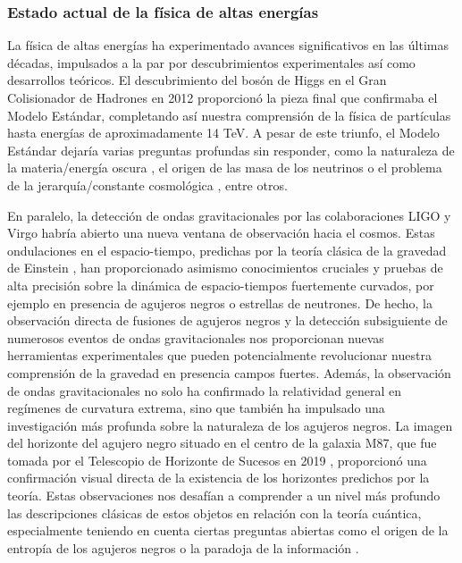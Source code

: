 \subsubsection*{Estado actual de la física de altas energías}

La física de altas energías ha experimentado avances significativos en las últimas décadas, impulsados a la par por descubrimientos experimentales así como desarrollos teóricos. El descubrimiento del bosón de Higgs \cite{ATLAS:2012yve, CMS:2012qbp} en el Gran Colisionador de Hadrones en 2012 proporcionó la pieza final que confirmaba el Modelo Estándar, completando así nuestra comprensión de la física de partículas hasta energías de aproximadamente 14 TeV. A pesar de este triunfo, el Modelo Estándar dejaría varias preguntas profundas sin responder, como la naturaleza de la materia/energía oscura \cite{Planck:2015fie}, el origen de las masa de los neutrinos \cite{Super-Kamiokande:1998uiq, SNO:2002tuh, KamLAND:2002uet} o el problema de la jerarquía/constante cosmológica \cite{Weinberg:1988cp}, entre otros.

En paralelo, la detección de ondas gravitacionales por las colaboraciones LIGO y Virgo \cite{LIGO} habría abierto una nueva ventana de observación hacia el cosmos. Estas ondulaciones en el espacio-tiempo, predichas por la teoría clásica de la gravedad de Einstein \cite{GW1, GW2}, han proporcionado asimismo conocimientos cruciales y pruebas de alta precisión sobre la dinámica de espacio-tiempos fuertemente curvados, por ejemplo en presencia de agujeros negros o estrellas de neutrones. De hecho, la observación directa de fusiones de agujeros negros y la detección subsiguiente de numerosos eventos de ondas gravitacionales nos proporcionan nuevas herramientas experimentales que pueden potencialmente revolucionar nuestra comprensión de la gravedad en presencia campos fuertes. Además, la observación de ondas gravitacionales no solo ha confirmado la relatividad general en regímenes de curvatura extrema, sino que también ha impulsado una investigación más profunda sobre la naturaleza de los agujeros negros. La imagen del horizonte del agujero negro situado en el centro de la galaxia M87, que fue tomada por el Telescopio de Horizonte de Sucesos en 2019 \cite{EventHorizonTelescope:2019dse}, proporcionó una confirmación visual directa de la existencia de los horizontes predichos por la teoría. Estas observaciones nos desafían a comprender a un nivel más profundo las descripciones clásicas de estos objetos en relación con la teoría cuántica, especialmente teniendo en cuenta ciertas preguntas abiertas como el origen de la entropía de los agujeros negros \cite{Bekenstein:1972tm, Hawking:1975vcx} o la paradoja de la información \cite{hawking2015information}.


